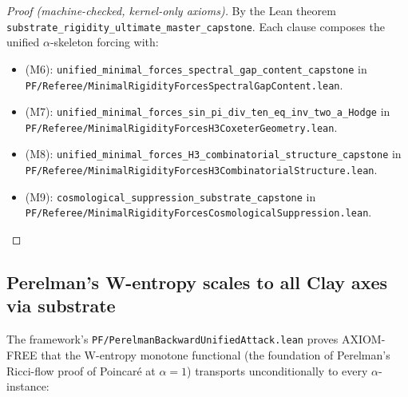 \begin{proof}[Proof (machine-checked, kernel-only axioms)]
By the Lean theorem
\texttt{substrate\_\allowbreak{}rigidity\_\allowbreak{}ultimate\_\allowbreak{}master\_\allowbreak{}capstone}. Each clause
composes the unified $\alpha$-skeleton forcing with:
\begin{itemize}
\setlength{\itemsep}{0pt}
\item (M6): \texttt{unified\_\allowbreak{}minimal\_\allowbreak{}forces\_\allowbreak{}spectral\_\allowbreak{}gap\_\allowbreak{}content\_\allowbreak{}capstone}
in \texttt{PF/\allowbreak{}Referee/\allowbreak{}Minimal\allowbreak{}Rigidity\allowbreak{}Forces\allowbreak{}Spectral\allowbreak{}Gap\allowbreak{}Content.\allowbreak{}lean}.
\item (M7): \texttt{unified\_\allowbreak{}minimal\_\allowbreak{}forces\_\allowbreak{}sin\_\allowbreak{}pi\_\allowbreak{}div\_\allowbreak{}ten\_\allowbreak{}eq\_\allowbreak{}inv\_\allowbreak{}two\_\allowbreak{}a\_\allowbreak{}Hodge}
in \texttt{PF/\allowbreak{}Referee/\allowbreak{}Minimal\allowbreak{}Rigidity\allowbreak{}Forces\allowbreak{}H3Coxeter\allowbreak{}Geometry.\allowbreak{}lean}.
\item (M8): \texttt{unified\_\allowbreak{}minimal\_\allowbreak{}forces\_\allowbreak{}H3\_\allowbreak{}combinatorial\_\allowbreak{}structure\_\allowbreak{}capstone}
in \texttt{PF/\allowbreak{}Referee/\allowbreak{}Minimal\allowbreak{}Rigidity\allowbreak{}Forces\allowbreak{}H3Combinatorial\allowbreak{}Structure.\allowbreak{}lean}.
\item (M9): \texttt{cosmological\_\allowbreak{}suppression\_\allowbreak{}substrate\_\allowbreak{}capstone}
in \texttt{PF/\allowbreak{}Referee/\allowbreak{}Minimal\allowbreak{}Rigidity\allowbreak{}Forces\allowbreak{}Cosmological\allowbreak{}Suppression.\allowbreak{}lean}.
\end{itemize}
\end{proof}

\subsection{Perelman's W-entropy scales to all Clay axes via substrate}
\label{subsec:perelman-w-entropy-scaling}

The framework's
\texttt{PF/\allowbreak{}Perelman\allowbreak{}Backward\allowbreak{}Unified\allowbreak{}Attack.\allowbreak{}lean} proves AXIOM-FREE that
the W-entropy monotone functional (the foundation of Perelman's
Ricci-flow proof of Poincaré at $\alpha = 1$) transports
unconditionally to every $\alpha$-instance:

